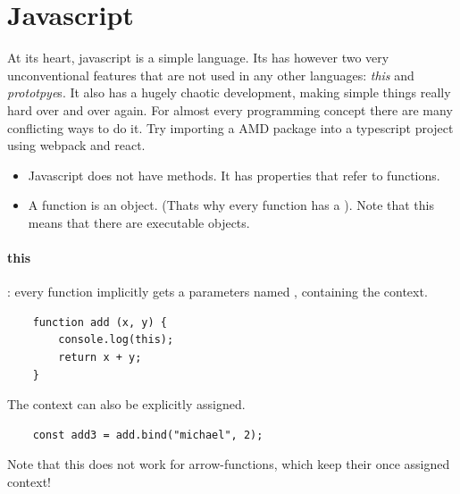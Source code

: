 \section{Javascript}
At its heart, javascript is a simple language. 
Its has however two very unconventional features that are not used in any other languages: \emph{this} and \emph{prototpye}s.
It also has a hugely chaotic development, making simple things really hard over and over again. 
For almost every programming concept there are many conflicting ways to do it. Try importing a AMD package into a typescript project using webpack and react.

\begin{itemize}
    \item Javascript does not have methods. It has properties that refer to functions.
    \item A function is an object. (Thats why every function has a ). Note that this means that there are executable objects.
\end{itemize}

 \paragraph{this}: every function implicitly gets a parameters named , containing the context. 
\begin{lstlisting}
    function add (x, y) {
        console.log(this);
        return x + y;
    }
\end{lstlisting}
The context  can also be explicitly assigned.
\begin{lstlisting}
    const add3 = add.bind("michael", 2);
\end{lstlisting}
Note that this does not work for arrow-functions, which keep their once assigned context!


